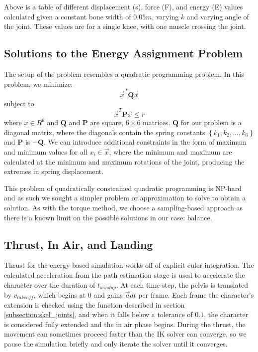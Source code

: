 \begin{table}[ht]
	\centering
	
	\caption[Table of estimated forces given $k$ values and joint angles]{Above is a table of different displacement (s), force (F), and energy (E) values calculated given a constant bone width of $0.05m$, varying $k$ and varying angle of the joint.  These values are for a single knee, with one muscle crossing the joint.}
	\label{tab:force_est}
\end{table}


\subsection{Solutions to the Energy Assignment Problem}
\label{subsection:energy_prob}
The setup of the problem resembles a quadratic programming problem.  In this problem, we minimize: \[ \vec{x}^T \mathbf{Q} \vec{x} \] subject to
\[ \vec{x}^T \mathbf{P} \vec{x} \le r \] where $x \in R^6$ and $\mathbf{Q}$ and $\mathbf{P}$ are square, $6 \times 6$ matrices.  $\mathbf{Q}$ for our problem is a diagonal matrix, where the diagonals contain the spring constants $\left\lbrace k_1, k_2, ... , k_6 \right\rbrace$ and $\mathbf{P}$ is $- \mathbf{Q}$.  We can introduce additional constraints in the form of maximum and minimum values for all $x_i \in \vec{x}$, where the minimum and maximum are calculated at the minimum and maximum rotations of the joint, producing the extremes in spring displacement.

This problem of quadratically constrained quadratic programming is NP-hard and as such we sought a simpler problem or approximation to solve to obtain a solution.  As with the torque method, we choose a sampling-based approach as there is a known limit on the possible solutions in our case: balance.  

\subsection{Thrust, In Air, and Landing}
\label{subsection:energy_thrust}
Thrust for the energy based simulation works off of explicit euler integration.  The calculated acceleration from the path estimation stage is used to accelerate the character over the duration of $t_{windup}$.  At each time step, the pelvis is translated by $v_{takeoff}$, which begins at 0 and gains $\vec{a} dt$ per frame.  Each frame the character's extension is checked using the function described in section \ref{subsection:skel_joints}, and when it falls below a tolerance of $0.1$, the character is considered fully extended and the in air phase begins.  During the thrust, the movement can sometimes proceed faster than the IK solver can converge, so we pause the simulation briefly and only iterate the solver until it converges.

